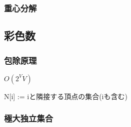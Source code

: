 \subsubsection{重心分解}

\subsection{彩色数}
\subsubsection{包除原理}
$O(2^VV)$\par
N[i] := iと隣接する頂点の集合(iも含む)\par

\subsubsection{極大独立集合}

